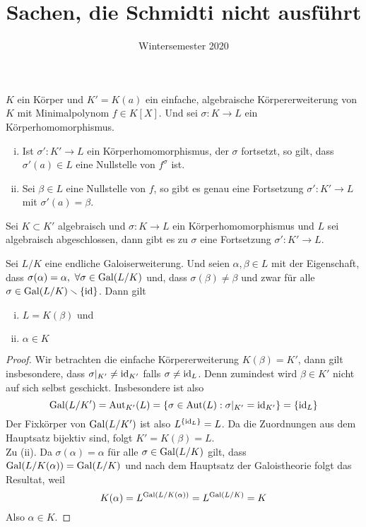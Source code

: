 \documentclass{scrartcl}
\title{Sachen, die Schmidti nicht ausführt}
\date{Wintersemester 2020}
\author{}
\begin{document}
    \maketitle
    \begin{satz}[1. Fortsetzungssatz] $K$ ein Körper und $K'=K(a)$ ein einfache, algebraische Körpererweiterung von $K$ mit Minimalpolynom $f\in K[X]$. Und sei $\sigma:K\to L$ ein Körperhomomorphismus. 
        \begin{enumerate}[(i)]
            \item Ist $\sigma':K'\to L$ ein Körperhomomorphismus, der $\sigma$ fortsetzt, so gilt, dass $\sigma'(a)\in L$ eine Nullstelle von $f^\sigma$ ist. 
            \item Sei $\beta \in L$ eine Nullstelle von $f$, so gibt es genau eine Fortsetzung $\sigma':K'\to L$ mit $\sigma'(a)=\beta$.
        \end{enumerate}
    \end{satz}
     \begin{satz}[2. Fortsetzungssatz]
         Sei $K\subset K'$ algebraisch und $\sigma:K\to L$ ein Körperhomomorphismus und $L$ sei algebraisch abgeschlossen, dann gibt es zu $\sigma$ eine Fortsetzung $\sigma':K'\to L$. 
     \end{satz}
     \begin{lemma}
         Sei $L/K$ eine endliche Galoiserweiterung. Und seien $\alpha,\beta\in L$ mit der Eigenschaft, dass $\sigma(\alpha)=\alpha,\ \forall \sigma\in \operatorname{Gal}(L/K)$ und, dass $\sigma(\beta)\neq \beta$ und zwar für alle $\sigma\in \operatorname{Gal}(L/K)\smallsetminus\{\mathrm{id}\}$.
         Dann gilt\begin{enumerate}[(i)]
             \item $L=K(\beta)$ und 
             \item $\alpha \in K$
         \end{enumerate} 
        \end{lemma}
        \begin{proof}
        Wir betrachten die einfache Körpererweiterung $K(\beta)=K'$, dann gilt insbesondere, dass $\sigma|_{K'}\neq \operatorname{id}_{K'}$ falls $\sigma\neq \operatorname{id}_L$. Denn zumindest wird $\beta\in K'$ nicht auf sich selbst geschickt. Insbesondere ist also \[\operatorname{Gal}(L/K') = \operatorname{Aut}_{K'}(L) = \{\sigma \in \operatorname{Aut}(L):\sigma|_{K'}=\operatorname{id}_{K'}\}=\{\operatorname{id}_L\}\]
        Der Fixkörper von $\operatorname{Gal}(L/K')$ ist also $L^{\{\operatorname{id}_L\}}=L$. Da die Zuordnungen aus dem Hauptsatz bijektiv sind, folgt $K'=K(\beta)=L$. \\
        Zu (ii). Da $\sigma(\alpha)=\alpha$ für alle $\sigma\in \operatorname{Gal}(L/K)$ gilt, dass $\operatorname{Gal}(L/K(\alpha))=\operatorname{Gal}(L/K)$ und nach dem Hauptsatz der Galoistheorie folgt das Resultat, weil \[K(\alpha)=L^{\operatorname{Gal}(L/K(\alpha))} = L^{\operatorname{Gal}(L/K)}=K\] Also $\alpha\in K$.
    \end{proof}
\end{document}
